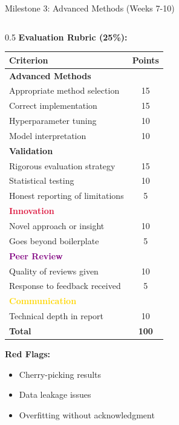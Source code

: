 \begin{frame}{Milestone 3: Advanced Methods (Weeks 7-10)}
\begin{columns}
\begin{column}{0.5\textwidth}
\textbf{Evaluation Rubric (25\%):}

\begin{table}
\tiny
\begin{tabular}{|l|c|}
\hline
\rowcolor{navyblue!20}
\textbf{Criterion} & \textbf{Points} \\
\hline
\textcolor{forest}{\textbf{Advanced Methods}} & \\
\hline
Appropriate method selection & 15 \\
Correct implementation & 15 \\
Hyperparameter tuning & 10 \\
Model interpretation & 10 \\
\hline
\textcolor{navyblue}{\textbf{Validation}} & \\
\hline
Rigorous evaluation strategy & 15 \\
Statistical testing & 10 \\
Honest reporting of limitations & 5 \\
\hline
\textcolor{crimson}{\textbf{Innovation}} & \\
\hline
Novel approach or insight & 10 \\
Goes beyond boilerplate & 5 \\
\hline
\textcolor{purple}{\textbf{Peer Review}} & \\
\hline
Quality of reviews given & 10 \\
Response to feedback received & 5 \\
\hline
\textcolor{gold}{\textbf{Communication}} & \\
\hline
Technical depth in report & 10 \\
\hline
\textbf{Total} & \textbf{100} \\
\hline
\end{tabular}
\end{table}

\vspace{0.2cm}

\textbf{Red Flags:}
\begin{itemize}
\item[$\times$] Cherry-picking results
\item[$\times$] Data leakage issues
\item[$\times$] Overfitting without acknowledgment
\end{itemize}
\end{column}
\end{columns}
\end{frame}

